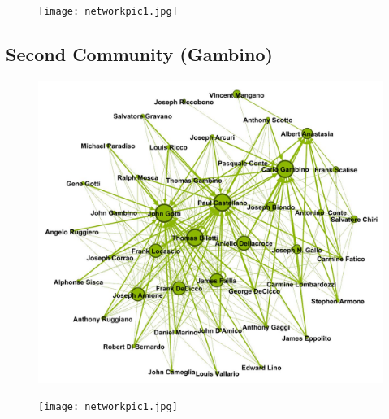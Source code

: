 \documentclass{article}
\begin{document}
\begin{figure}[t!]
\vspace{-250pt}
\centering
\texttt{[image: networkpic1.jpg]}
\advance\leftskip-3.52cm
\end{figure}



\textcolor{Titoli}{\subsection{Second Community (Gambino)}}
\begin{figure}[h!]
\vspace{35pt}
\centering
\includegraphics[width=550pt]{gambinomodule.JPG}
\advance\leftskip-2.5cm
\end{figure}
\newpage



\begin{figure}[t!]
\vspace{-250pt}
\centering
\texttt{[image: networkpic1.jpg]}
\advance\leftskip-3.52cm
\end{figure}
\end{document}
